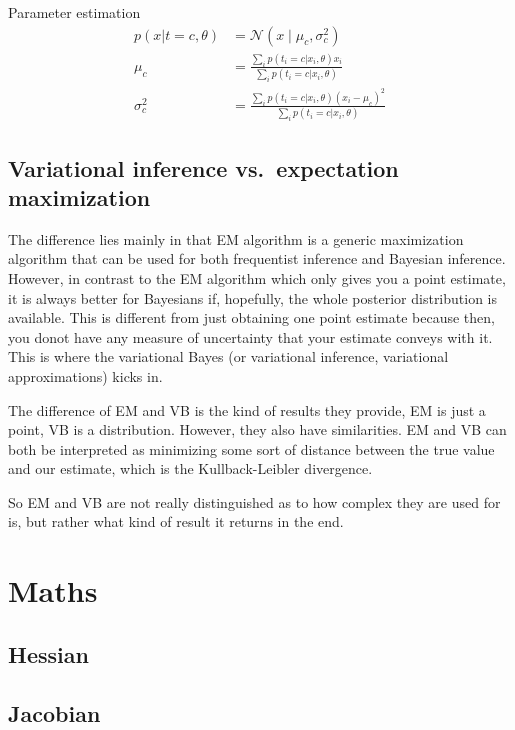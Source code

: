 \documentclass{book}
\begin{document}
Parameter estimation
\begin{align*}
p(x | t=c, \theta) &= \mathcal{N}(x\mid \mu_c ,\sigma^{2}_{c}) \\
\mu_c  &= \frac{\sum_i p(t_i = c | x_i, \theta) x_i}{\sum_i p(t_i = c | x_i, \theta)} \\
\sigma^{2}_{c} &= \frac{\sum_i p(t_i = c | x_i, \theta) (x_i - \mu_c)^2}{\sum_i p(t_i = c | x_i, \theta)}
\end{align*}

\section{Variational inference vs.\ expectation maximization}
The difference lies mainly in that EM algorithm is a generic maximization algorithm that can be used for both frequentist inference and Bayesian inference. However, in contrast to the EM algorithm which only gives you a point estimate, it is always better for Bayesians if, hopefully, the whole posterior distribution is available. This is different from just obtaining one point estimate because then, you donot have any measure of uncertainty that your estimate conveys with it. This is where the variational Bayes (or variational inference, variational approximations) kicks in.

The difference of EM and VB is the kind of results they provide, EM is just a point, VB is a distribution. However, they also have similarities. EM and VB can both be interpreted as minimizing some sort of distance between the true value and our estimate, which is the Kullback-Leibler divergence.

So EM and VB are not really distinguished as to how complex they are used for is, but rather what kind of result it returns in the end.

\chapter{Maths}

\section{Hessian}

\section{Jacobian}

\newpage
\renewcommand{\cftchapdotsep}{\cftdotsep}
\tableofcontents


\newpage

 
\end{document}

